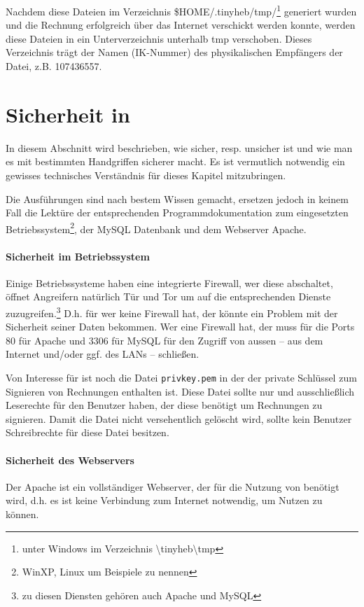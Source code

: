 Nachdem diese Dateien im Verzeichnis \$HOME/.tinyheb/tmp/\footnote{unter Windows im Verzeichnis \textbackslash tinyheb\textbackslash tmp}
generiert wurden und die Rechnung erfolgreich über das Internet 
verschickt werden konnte, werden diese Dateien in ein Unterverzeichnis 
unterhalb tmp verschoben. Dieses Verzeichnis trägt der Namen (IK-Nummer)
des physikalischen Empfängers der Datei, z.B. 107436557.




\section{Sicherheit in \tinyHeb\/}

In diesem Abschnitt wird beschrieben, wie sicher, resp. unsicher 
\tinyHeb\/ ist und wie man es mit bestimmten Handgriffen sicherer macht.
Es ist vermutlich notwendig ein gewisses technisches Verständnis für dieses
Kapitel mitzubringen.

Die Ausführungen sind nach bestem Wissen gemacht, ersetzen jedoch in 
keinem Fall die Lektüre der entsprechenden Programmdokumentation zum
eingesetzten Betriebssystem\footnote{WinXP, Linux um Beispiele zu nennen}, 
der MySQL Datenbank und dem Webserver Apache.

\paragraph{Sicherheit im Betriebssystem}
Einige Betriebssysteme haben eine integrierte Firewall, wer diese abschaltet,
öffnet Angreifern natürlich Tür und Tor um auf die entsprechenden Dienste
zuzugreifen.\footnote{zu diesen Diensten gehören auch Apache und MySQL}
D.h. für \tinyHeb\/ wer keine Firewall hat, der könnte ein Problem mit
der Sicherheit seiner Daten bekommen.
Wer eine Firewall hat, der muss für \tinyHeb\/ die Ports 80 für Apache und
3306 für MySQL für den Zugriff von aussen -- aus dem Internet und/oder
ggf. des LANs -- schließen.

Von Interesse für \tinyHeb\/ ist noch die Datei \verb|privkey.pem| in
der der private Schlüssel zum Signieren von Rechnungen enthalten ist.
Diese Datei sollte nur und ausschließlich Leserechte für den Benutzer
haben, der diese benötigt um Rechnungen zu signieren. 
Damit die Datei nicht versehentlich gelöscht wird,
sollte kein Benutzer Schreibrechte für diese Datei besitzen.


\paragraph{Sicherheit des Webservers}
Der Apache ist ein vollständiger Webserver, der für die Nutzung von
\tinyHeb\/ benötigt wird, d.h. es ist keine Verbindung zum Internet
notwendig, um \tinyHeb\/ Nutzen zu können.

